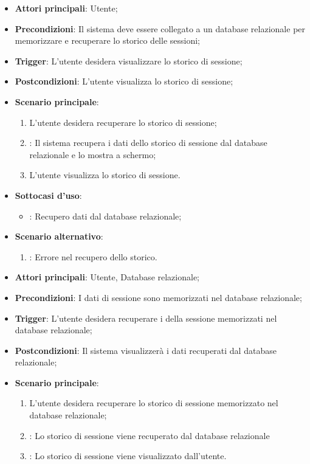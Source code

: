 \begin{itemize}
    \item \textbf{Attori principali}: Utente;
    \item \textbf{Precondizioni}: Il sistema deve essere collegato a un database relazionale per memorizzare e recuperare lo storico delle sessioni;
    \item \textbf{Trigger}: L'utente desidera visualizzare lo storico di sessione;
    \item \textbf{Postcondizioni}: L'utente visualizza lo storico di sessione;
    \item \textbf{Scenario principale}:
    \begin{enumerate}
        \item L'utente desidera recuperare lo storico di sessione;
        \item {}: Il sistema recupera i dati dello storico di sessione dal database relazionale e lo mostra a schermo;
        \item L'utente visualizza lo storico di sessione.
    \end{enumerate}

    \item \textbf{Sottocasi d'uso}:
    \begin{itemize}
        \item {}: Recupero dati dal database relazionale;
    \end{itemize}
    \item \textbf{Scenario alternativo}:
    \begin{enumerate}
        \item {}: Errore nel recupero dello storico.
    \end{enumerate}
\end{itemize}

\hypertarget{UC9.1}{}

\begin{itemize}
    \item \textbf{Attori principali}: Utente, Database relazionale;
    \item \textbf{Precondizioni}: I dati di sessione sono memorizzati nel database relazionale;
    \item \textbf{Trigger}: L'utente desidera recuperare i della sessione memorizzati nel database relazionale;
    \item \textbf{Postcondizioni}: Il sistema visualizzerà i dati recuperati dal database relazionale;
    \item \textbf{Scenario principale}:
    \begin{enumerate}
        \item L'utente desidera recuperare lo storico di sessione memorizzato nel database relazionale;
        \item {}: Lo storico di sessione viene recuperato dal database relazionale
        \item {}: Lo storico di sessione viene visualizzato dall'utente.
    \end{enumerate}
\end{itemize}

